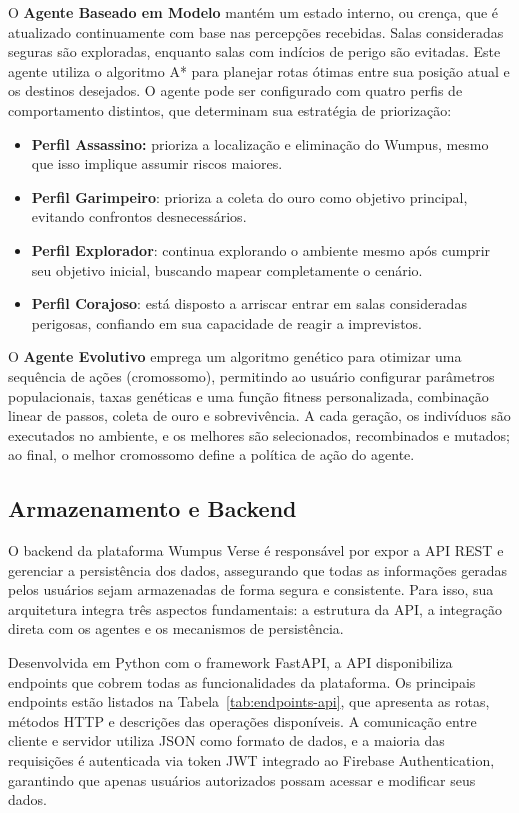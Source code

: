 O \textbf{Agente Baseado em Modelo} mantém um estado interno, ou crença, que é atualizado continuamente com base nas percepções recebidas. Salas consideradas seguras são exploradas, enquanto salas com indícios de perigo são evitadas. Este agente utiliza o algoritmo A* para planejar rotas ótimas entre sua posição atual e os destinos desejados. O agente pode ser configurado com quatro perfis de comportamento distintos, que determinam sua estratégia de priorização:

\begin{itemize}
    \item \textbf{Perfil Assassino:} prioriza a localização e eliminação do Wumpus, mesmo que isso implique assumir riscos maiores.
    \item \textbf{Perfil Garimpeiro}: prioriza a coleta do ouro como objetivo principal, evitando confrontos desnecessários.
    \item \textbf{Perfil Explorador}: continua explorando o ambiente mesmo após cumprir seu objetivo inicial, buscando mapear completamente o cenário.
    \item \textbf{Perfil Corajoso}: está disposto a arriscar entrar em salas consideradas perigosas, confiando em sua capacidade de reagir a imprevistos.
\end{itemize}

O \textbf{Agente Evolutivo} emprega um algoritmo genético para otimizar uma sequência de ações (cromossomo), permitindo ao usuário configurar parâmetros populacionais, taxas genéticas e uma função fitness personalizada, combinação linear de passos, coleta de ouro e sobrevivência. A cada geração, os indivíduos são executados no ambiente, e os melhores são selecionados, recombinados e mutados; ao final, o melhor cromossomo define a política de ação do agente.

\subsection{Armazenamento e Backend}

O backend da plataforma Wumpus Verse é responsável por expor a API REST e gerenciar a persistência dos dados, assegurando que todas as informações geradas pelos usuários sejam armazenadas de forma segura e consistente. Para isso, sua arquitetura integra três aspectos fundamentais: a estrutura da API, a integração direta com os agentes e os mecanismos de persistência.

Desenvolvida em Python com o framework FastAPI, a API disponibiliza endpoints que cobrem todas as funcionalidades da plataforma. Os principais endpoints estão listados na Tabela~\ref{tab:endpoints-api}, que apresenta as rotas, métodos HTTP e descrições das operações disponíveis. A comunicação entre cliente e servidor utiliza JSON como formato de dados, e a maioria das requisições é autenticada via token JWT integrado ao Firebase Authentication, garantindo que apenas usuários autorizados possam acessar e modificar seus dados.

